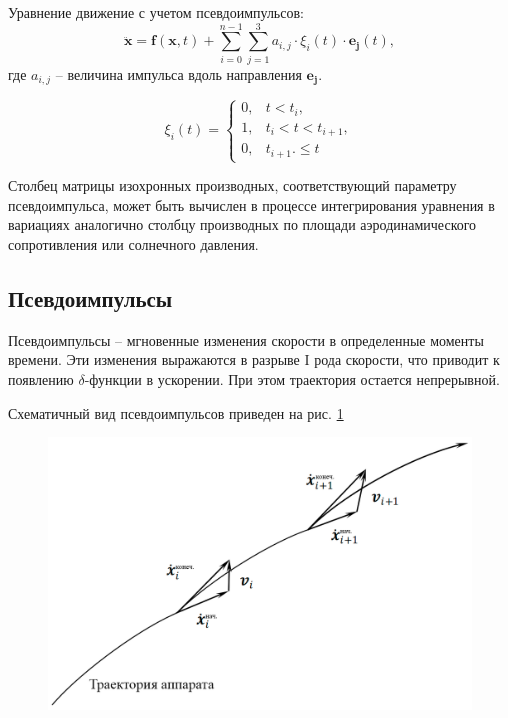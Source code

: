 Уравнение движение с учетом псевдоимпульсов:
\begin{equation*}
    \ddot{\mathbf{x}} = \mathbf{f}(\mathbf{x}, t) +
        \sum_{i=0}^{n-1} \sum_{j=1}^{3} a_{i,j} \cdot \xi_{i}(t) \cdot \mathbf{e_j} (t),
\end{equation*}
где $a_{i,j}$ -- величина импульса вдоль направления $\mathbf{e_j}$.

\begin{equation*}
    \xi_{i}(t) = 
            \begin{cases}
                0, & t < t_i, \\
                1, & t_i < t < t_{i+1}, \\
                0, & t_{i+1}. \le t
            \end{cases}
\end{equation*}

Столбец матрицы изохронных производных, соответствующий параметру псевдоимпульса,
может быть вычислен в процессе интегрирования уравнения в вариациях аналогично
столбцу производных по площади аэродинамического сопротивления или солнечного давления.

\subsection{Псевдоимпульсы}

Псевдоимпульсы -- мгновенные изменения скорости в определенные моменты времени.
Эти изменения выражаются в разрыве I рода скорости, что приводит к появлению
$\delta$-функции в ускорении. При этом траектория остается непрерывной.

Схематичный вид псевдоимпульсов приведен на рис. \ref{fig:pseudoimp}

\begin{figure}[h!]
    \centering
    \includegraphics[width=0.8\linewidth]{../images/solution/lageos/pseudoimp.png}
    \label{fig:pseudoimp}
 \end{figure}

